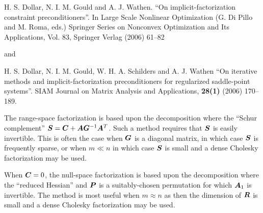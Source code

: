 \documentclass{galahad}
\begin{document}
\noindent
H. S. Dollar, N. I. M. Gould and A. J. Wathen.
``On implicit-factorization constraint preconditioners''.
In  Large Scale Nonlinear Optimization (G. Di Pillo and M. Roma, eds.)
Springer Series on Nonconvex Optimization and Its Applications, Vol. 83,
Springer Verlag (2006) 61--82

\noindent
and

\noindent
H. S. Dollar, N. I. M. Gould, W. H. A. Schilders and A. J. Wathen
``On iterative methods and implicit-factorization preconditioners for 
regularized saddle-point systems''.
SIAM Journal on Matrix Analysis and Applications, {\bf 28(1)} (2006) 170--189.
\vspace*{1mm}

\noindent
The range-space factorization is based upon the decomposition
where the ``Schur complement'' ${\bm{S}} = {\bm{C}} + {\bm{A}} {\bm{G}}^{-1} {\bm{A}}^T$.
Such a method requires that ${\bm{S}}$ is easily invertible. This is often the
case when ${\bm{G}}$ is a diagonal matrix, in which case ${\bm{S}}$ is frequently 
sparse, or when $m \ll n$ in which case ${\bm{S}}$ 
is small and a dense Cholesky factorization may be used.
\vspace*{1mm}

\noindent
When ${\bm{C}} = 0$, the null-space factorization is based upon the decomposition
where the ``reduced Hessian''
and ${\bm{P}}$ is a suitably-chosen permutation for which ${\bm{A}}_1$ is invertible.
The method is most useful when $m \approx n$ as then the dimension
of ${\bm{R}}$ is small and a dense Cholesky factorization may be used.
\end{document}
